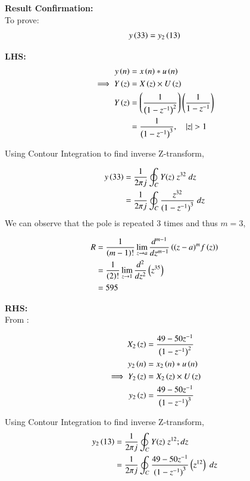 \documentclass[journal,12pt,onecolumn]{IEEEtran}
\theoremstyle{remark}
\begin{document}
\textbf{Result Confirmation:}\\

To prove:\\
\begin{equation}
y\left(33\right)=y_2\left(13\right)
\end{equation}

\textbf{LHS:}\\

\begin{align}
y\left(n\right)&=x\left(n\right)*u\left(n\right)\\
\implies Y\left(z\right)&=X\left(z\right) \times U\left(z\right)\\
Y\left(z\right)&=\left(\frac{1}{\left(1-z^{-1}\right)^2}\right)\left(\frac{1}{1-z^{-1}}\right)\\
&=\frac{1}{\left(1-z^{-1}\right)^3},\quad \left\vert z\right\vert>1\\
\end{align}

Using Contour Integration to find inverse Z-transform,

\begin{align}
y\left(33\right)&=\frac{1}{2\pi j}\oint_{C}Y(z) \;z^{32} \;dz\\
 &=\frac{1}{2\pi j}\oint_{C}\frac{z^{32}}{({1-z^{-1})}^{3}} \;dz 
\end{align}
We can observe that the pole is repeated $3$ times and thus $m=3$,

\begin{align}
R&=\frac{1}{\left(m-1\right)!}\lim\limits_{z\to a}\frac{d^{m-1}}{dz^{m-1}}\left({(z-a)}^{m}f\left(z\right)\right) \\
&=\frac{1}{\left(2\right)!}\lim\limits_{z\to 1}\frac{d^{2}}{dz^{2}}\left(z^{35}\right)\\
&=595
\end{align}

\newpage
\textbf{RHS:}\\

\quad From :

\begin{align}
X_2\left(z\right)&=\frac{49-50z^{-1}}{\left(1-z^{-1}\right)^{2}}\\
y_2\left(n\right)&=x_2\left(n\right)*u\left(n\right)\\
\implies Y_2\left(z\right)&=X_2\left(z\right) \times U\left(z\right)\\
y_2\left(z\right)&=\frac{49-50z^{-1}}{\left(1-z^{-1}\right)^{3}}\\
\end{align}

Using Contour Integration to find inverse Z-transform,
\begin{align}
y_2\left(13\right)&=\frac{1}{2\pi j}\oint_{C}Y(z) \;z^{12} ;dz\\
 &=\frac{1}{2\pi j}\oint_{C}\frac{49-50z^{-1}}{({1-z^{-1})}^{3}}\left(z^{12}\right) \;dz 
\end{align}
\end{document}
